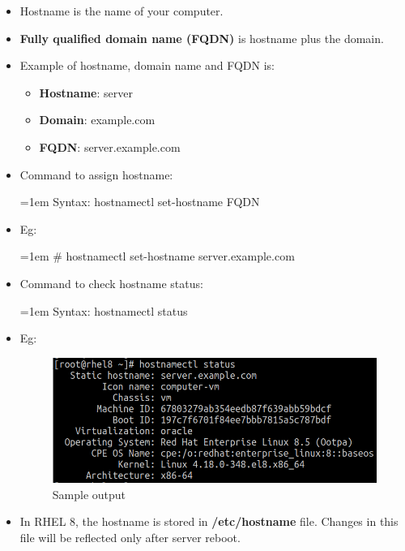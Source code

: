 \setlength{\columnsep}{3pt}
\begin{flushleft}
\bigskip


\begin{itemize}
	\item Hostname is the name of your computer.
	
	\item \textbf{Fully qualified domain name (FQDN)} is hostname plus the domain.
	
	\item Example of hostname, domain name and FQDN is:
	\begin{itemize}
		\item \textbf{Hostname}: server
		\item \textbf{Domain}: example.com
		\item \textbf{FQDN}: server.example.com
	\end{itemize}
	\bigskip
	\item Command to assign hostname:
	\begin{tcolorbox}[breakable,notitle,boxrule=-0pt,colback=pink,colframe=pink]
		\color{black}
		\font=1em
		Syntax: hostnamectl set-hostname FQDN
		\font=4pt
	\end{tcolorbox}
	\bigskip
	\item Eg:
	\begin{tcolorbox}[breakable,notitle,boxrule=-0pt,colback=black,colframe=black]
		\color{green}
		\font=1em
		\# hostnamectl set-hostname server.example.com
		\font=4pt
	\end{tcolorbox}

	\item Command to check hostname status:
	\begin{tcolorbox}[breakable,notitle,boxrule=-0pt,colback=pink,colframe=pink]
		\color{black}
		\font=1em
		Syntax: hostnamectl status
		\font=4pt
	\end{tcolorbox}
	\bigskip
	\item Eg:
	\begin{figure}[h!]
		\centering
		\includegraphics[scale=.35]{content/chapter14/images/hostname.png}
		\caption{Sample output}
		\label{fig:hoststatus}
	\end{figure}		

	\bigskip
	\item In RHEL 8, the hostname is stored in \textbf{/etc/hostname} file. Changes in this file will be reflected only after server reboot.
	
	

\end{itemize}



\end{flushleft}
\newpage


